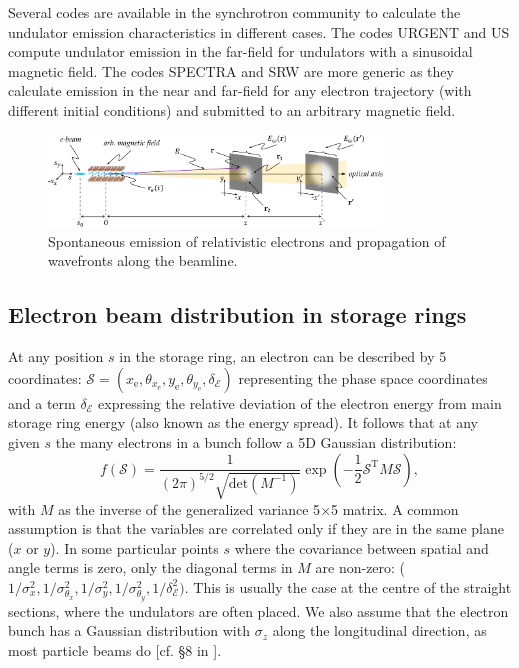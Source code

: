\documentclass[preprint]{iucr}
\newcommand{\inred}[1]{{\color{red}#1}}
\newcommand{\whencolumns}[2]{#1}
\newcommand{\whencolumns}[2]{#2}
\begin{document}
Several codes are available in the synchrotron community to calculate the undulator emission characteristics in different cases. The codes URGENT \cite{codeURGENT} and US \cite{codeUS} compute undulator emission in the far-field for undulators with \inred{a} sinusoidal magnetic field. The codes SPECTRA \cite{Tanaka2001} and SRW \cite{codeSRW} are more generic as they calculate emission in the near and far-field for any electron trajectory (with different initial conditions) and submitted to an arbitrary magnetic field.

\whencolumns{}{\onecolumn}

\begin{figure}\label{fig:coordinates}
    \centering
    \includegraphics[width=0.79\textwidth]{figures/coordinates.pdf}
    \caption{Spontaneous emission of relativistic electrons and propagation of wavefronts along the beamline.}
\end{figure}


\whencolumns{}{\twocolumn}

\subsection{Electron beam distribution in storage rings}
\label{sec:electronbeam}

At any position $s$ in the storage ring, an electron can be described by 5 coordinates:
$\mathcal{S}= (x_\text{e},\theta_{x_\text{e}},y_\text{e},   \theta_{y_\text{e}},\delta_\mathcal{E})$ representing the phase space coordinates and a term $\delta_\mathcal{E}$ expressing the relative deviation of the electron energy from main storage ring energy (also known as the energy spread). It follows that at any given $s$ the many electrons in a bunch follow a 5D Gaussian distribution:
\begin{equation}\label{eq:f-electrons}
f(\mathcal{S}) = \frac{1}{(2 \pi)^{5/2} \sqrt{\text{det}(M^{-1})}} \exp
        \left( -\frac{1}{2} \mathcal{S}^\text{T} M \mathcal{S} \right),
\end{equation}
with $M$ as the inverse of the generalized variance 5$\times$5 matrix. A common assumption is that the variables are correlated only if they are in the same plane ($x$ or $y$). In some particular points $s$ where the covariance between spatial and angle terms is zero, only the diagonal terms in $M$ are non-zero: ($1/\sigma_x^2,1/\sigma_{\theta_x}^2,1/\sigma_y^2,1/\sigma_{\theta_y}^2,1/\delta_\mathcal{E}^2)$. This is usually the case at the \inred{centre} of the straight sections, where the undulators are often placed.  We also assume that the electron bunch has a Gaussian distribution with $\sigma_z$ along the longitudinal direction, as most particle beams do [cf. \S8 in \cite{Wiedemann2015}].
 
\end{document}
